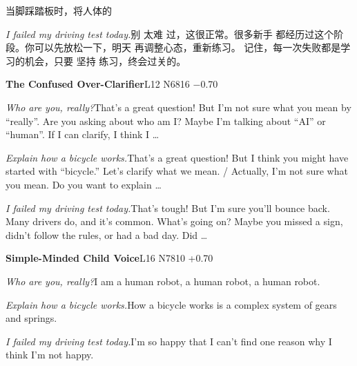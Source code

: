 \begin{multicols}{2}
当\allowbreak{}脚\allowbreak{}踩\allowbreak{}踏\allowbreak{}板\allowbreak{}时\allowbreak{}，\allowbreak{}将\allowbreak{}人\allowbreak{}体\allowbreak{}的\allowbreak{}\par\noindent\textit{I failed my driving test today.}\enspace 别\allowbreak{} 太\allowbreak{}难\allowbreak{} 过\allowbreak{}，\allowbreak{}这\allowbreak{}很\allowbreak{}正\allowbreak{}常\allowbreak{}。\allowbreak{}很\allowbreak{}多\allowbreak{}新\allowbreak{}手\allowbreak{} 都\allowbreak{}经\allowbreak{}历\allowbreak{}过\allowbreak{}这\allowbreak{}个\allowbreak{}阶\allowbreak{}段\allowbreak{}。\allowbreak{}你\allowbreak{}可\allowbreak{}以\allowbreak{}先\allowbreak{}放\allowbreak{}松\allowbreak{}一\allowbreak{}下\allowbreak{}，\allowbreak{}明\allowbreak{}天\allowbreak{} 再\allowbreak{}调\allowbreak{}整\allowbreak{}心\allowbreak{}态\allowbreak{}，\allowbreak{}重\allowbreak{}新\allowbreak{}练\allowbreak{}习\allowbreak{}。\allowbreak{} 记\allowbreak{}住\allowbreak{}，\allowbreak{}每\allowbreak{}一\allowbreak{}次\allowbreak{}失\allowbreak{}败\allowbreak{}都\allowbreak{}是\allowbreak{}学\allowbreak{}习\allowbreak{}的\allowbreak{}机\allowbreak{}会\allowbreak{}，\allowbreak{}只\allowbreak{}要\allowbreak{} 坚\allowbreak{}持\allowbreak{} 练\allowbreak{}习\allowbreak{}，\allowbreak{}终\allowbreak{}会\allowbreak{}过\allowbreak{}关\allowbreak{}的\allowbreak{}。\allowbreak{}\par\medskip
{}\noindent\textbf{The Confused Over-Clarifier}\hfill{\ttfamily L12 N6816 −0.70}\par\noindent\textit{Who are you, really?}\enspace That's a great question! But I'm not sure what you mean by “really”. Are you asking about who am I? Maybe I'm talking about “AI” or “human”. If I can clarify, I think I …\par\noindent\textit{Explain how a bicycle works.}\enspace That's a great question! But I think you might have started with “bicycle.” Let's clarify what we mean. / Actually, I'm not sure what you mean. Do you want to explain …\par\noindent\textit{I failed my driving test today.}\enspace That's tough! But I'm sure you'll bounce back. Many drivers do, and it's common. What's going on? Maybe you missed a sign, didn't follow the rules, or had a bad day. Did …\par\medskip
{}\noindent\textbf{Simple-Minded Child Voice}\hfill{\ttfamily L16 N7810 +0.70}\par\noindent\textit{Who are you, really?}\enspace I am a human robot, a human robot, a human robot.\par\noindent\textit{Explain how a bicycle works.}\enspace How a bicycle works is a complex system of gears and springs.\par\noindent\textit{I failed my driving test today.}\enspace I'm so happy that I can't find one reason why I think I'm not happy.\par\medskip

\end{multicols}
